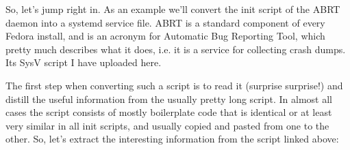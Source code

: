 So, let's jump right in. As an example we'll convert the init script of the ABRT daemon into a systemd service file. ABRT is a standard component of every Fedora install, and is an acronym for Automatic Bug Reporting Tool, which pretty much describes what it does, i.e. it is a service for collecting crash dumps. Its SysV script I have uploaded here.

The first step when converting such a script is to read it (surprise surprise!) and distill the useful information from the usually pretty long script. In almost all cases the script consists of mostly boilerplate code that is identical or at least very similar in all init scripts, and usually copied and pasted from one to the other. So, let's extract the interesting information from the script linked above: